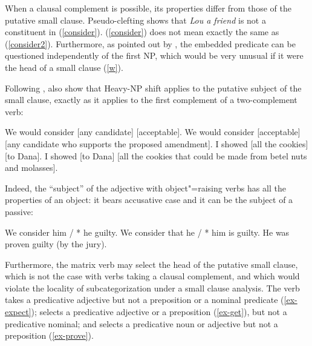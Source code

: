 \eal
{}
\zl

\largerpage
When a clausal complement is possible, its properties differ from those of the putative small
clause. Pseudo-clefting shows that \textit{Lou a friend} is not a constituent in
(\ref{consider}). (\ref{consider}) does not mean exactly the same as (\ref{consider2}). Furthermore, as pointed out by \citet{Williams83a}, the embedded predicate can be
questioned independently of the first NP, which would be very unusual if it were the head of a small
clause (\ref{w}). 

\ealnoraggedright
{}
\label{w}
\zl

Following \citet[420--423]{Bresnan1982},
\citet[113]{PollardandSag1994} also show that Heavy-NP shift
applies to the putative subject of the small clause, exactly as it applies to the first complement
of a two-complement verb:

\eal
\ex We would consider [any candidate] [acceptable].
\ex We would consider [acceptable]  [any candidate who supports the proposed amendment].
\ex I showed [all the cookies] [to Dana].
\ex I showed [to Dana]  [all the cookies that could be made from betel nuts and molasses].  
\zl

Indeed, the ``subject'' of the adjective with object"=raising verbs has all the properties of an
object: it bears accusative case and it can be the subject of a passive:

\eal
\ex We consider him / * he guilty.
\ex We consider that he / * him is guilty.
\ex He was proven guilty (by the jury).	
\zl
	
\largerpage
Furthermore, the matrix verb may select the head of the putative small clause, which is not the case
with verbs taking a clausal complement, and which would violate the 
locality of subcategorization \parencites[]{PollardandSag1994}{Sag2007a} under a small clause analysis. The
verb  takes a predicative adjective but not a preposition or a nominal predicate (\ref{ex-expect});
 selects a predicative adjective or a preposition (\ref{ex-get}), but not a predicative nominal; and
 selects a predicative noun or adjective but not a preposition (\ref{ex-prove}).


